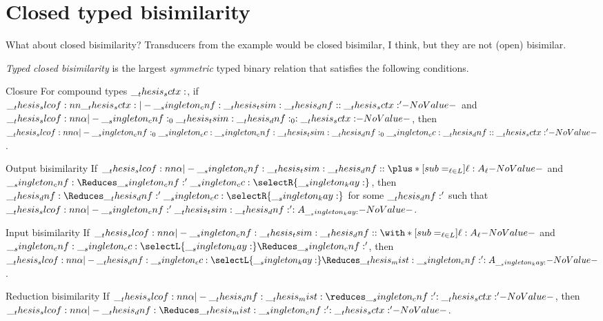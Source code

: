 \section{Closed typed bisimilarity}

What about closed bisimilarity?
Transducers from the example would be closed bisimilar, I think, but they are not (open) bisimilar.


\begin{definition}
  \emph{Typed closed bisimilarity} is the largest \emph{symmetric} typed binary relation that satisfies the following conditions.
  \begin{thmdescription}
  \item[Closure]
    For compound types $\__thesis_sctx:$, if $\slcof{\sctx |- \cnf \tsim \dnf : \sctx'}$ and $\slcof{\alpha |- \cnf_0 \tsim \dnf_0 : \sctx}$, then $\slcof{\alpha |- \cnf_0 \cc \cnf \tsim \dnf_0 \cc \dnf : \sctx'}$.
  \item[Output bisimilarity]
    If $\slcof{\alpha |- \cnf \tsim \dnf : \plus*[sub=_{\ell \in L}]{\ell:A_{\ell}}}$ and $\cnf \Reduces \cnf' \cc \selectR{\kay}$, then $\dnf \Reduces \dnf' \cc \selectR{\kay}$ for some $\__thesis_dnf:'$ such that $\slcof{\alpha |- \cnf' \tsim \dnf' : A_{\kay}}$.
  \item[Input bisimilarity]
    If $\slcof{\alpha |- \cnf \tsim \dnf : \with*[sub=_{\ell \in L}]{\ell:A_{\ell}}}$ and $\cnf \cc \selectL{\kay} \Reduces \cnf'$, then $\slcof{\alpha |- \dnf \cc \selectL{\kay} \Reduces\mist \cnf' : A_{\kay}}$.
  \item[Reduction bisimilarity]
    If $\slcof{\alpha |- \dnf \mist\reduces \cnf' : \sctx'}$, then $\slcof{\alpha |- \dnf \Reduces\mist \cnf' : \sctx'}$.%
  \end{thmdescription}
\end{definition}


